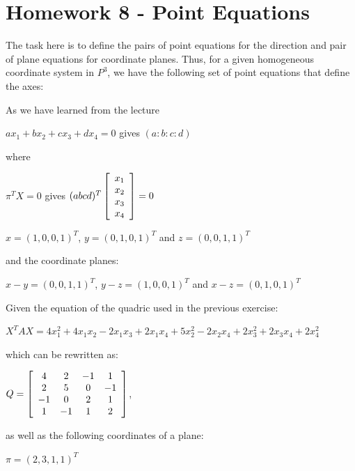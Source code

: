 \documentclass[]{article}
\begin{document}
\section{Homework 8 - Point Equations}
The task here is to define the pairs of point equations for the direction and pair of plane equations for coordinate planes. Thus, for a given homogeneous coordinate system in $P^3$, we have the following set of point equations that define the axes:

As we have learned from the lecture 

\centerline {
	$ax_1 + bx_2 + cx_3 + dx_4 = 0$ gives $(a: b: c: d)$
}

where 

\centerline {
	$\pi ^TX = 0$ gives  $(a b c d)^T \left[ {\begin{array}{*{20}c}
		x_1 \\
		x_2 \\ 
		x_3 \\
		x_4   
		\end{array} } \right] = 0$
}

\centerline {
	$x = (1, 0, 0, 1)^T$, $y = (0, 1, 0, 1)^T$ and $z = (0, 0, 1, 1)^T$
} 

and the coordinate planes:

\centerline {
	$x - y = (0, 0, 1, 1)^T$, $y - z = (1, 0, 0, 1)^T$ and $x - z = (0, 1, 0, 1)^T$
}

Given the equation of the quadric used in the previous exercise:

\centerline {
	$X^TAX = 4x_1^2 + 4x_1x_2 - 2x_1x_3 + 2x_1x_4 + 5x_2^2 - 2x_2x_4 + 2x_3^2 + 2x_3x_4 + 2x_4^2$
}

which can be rewritten as: 

\vspace{0.5em}

\centerline {
	$Q = \left[ {\begin{array}{*{20}c}
		4 & 2 & -1 & 1\\
		2 & 5 & 0 & -1 \\ 
		-1 & 0 & 2 & 1 \\
		1 & -1 & 1 & 2  
		\end{array} } \right]$,
}

\vspace{0.5em}

as well as the following coordinates of a plane: 

\vspace{0.5em}

\centerline {
	$\pi = (2, 3, 1, 1)^T$
}
\end{document}
